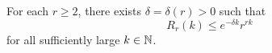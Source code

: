 \begin{theorem}\label{thm:Ramsey:multicolour}
  For each $r \ge 2$, there exists $\delta = \delta(r) > 0$ such that 
  \begin{equation*}
    R_r(k) \le e^{-\delta k} r^{rk}
  \end{equation*} 
  for all sufficiently large $k \in \mathbb{N}$. 
\end{theorem}
